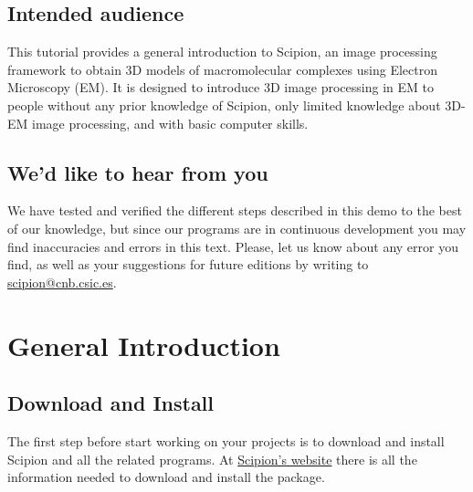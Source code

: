 \documentclass[12pt]{article} %
\begin{document}



\subsection*{Intended audience}

This tutorial provides a general introduction to Scipion, an image
processing framework to obtain 3D models of macromolecular complexes
using Electron Microscopy (EM). It is designed to introduce 3D image
processing in EM to people without any prior knowledge of Scipion,
only limited knowledge about 3D-EM image processing, and with basic
computer skills.

\subsection*{We'd like to hear from you}

We have tested and verified the different steps described in this demo
to the best of our knowledge, but since our programs are in continuous
development you may find inaccuracies and errors in this text. Please,
let us know about any error you find, as well as your suggestions for
future editions by writing to
\href{mailto:scipion@cnb.csic.es}{scipion@cnb.csic.es}.

\newpage

\tableofcontents %

\newpage %


\section{General Introduction}

\subsection{Download and Install}

The first step before start working on your projects is to download and
install Scipion and all the related programs. At \href{http://scipionwiki.cnb.csic.es}{Scipion's website} 
there is all the information needed to download and install the package.
\end{document}
